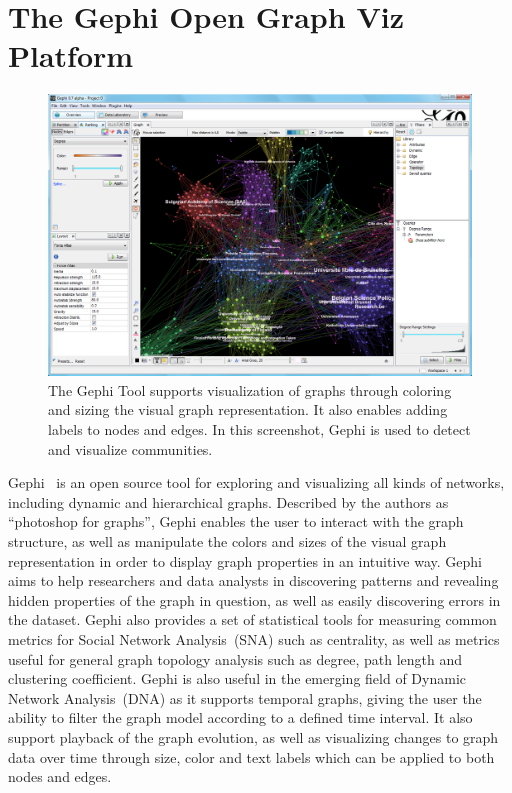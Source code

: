 \section{The Gephi Open Graph Viz Platform}

\begin{figure}[h]
    \centering
    \includegraphics[width=\textwidth]{img/gephi1}
    \caption{The Gephi Tool supports
        visualization of graphs through coloring and sizing the visual
        graph
        representation. It also enables adding labels to nodes and
        edges. In
        this screenshot, Gephi is used to detect and visualize
    communities.}
\label{img:gephi1}
\end{figure}

Gephi~\cite{ICWSM09154} is an open source tool for exploring and
visualizing all kinds of networks, including dynamic and hierarchical
graphs. Described by the authors as ``photoshop for graphs'', Gephi
enables the user to interact with the graph structure, as well as
manipulate the colors and sizes of the visual graph representation in
order to display graph properties in an intuitive way. Gephi aims to
help researchers and data analysts in discovering patterns and revealing
hidden properties of the graph in question, as well as easily
discovering errors in the dataset. Gephi also provides a set of
statistical tools for measuring common metrics for Social Network
Analysis~(SNA) such as centrality, as well as metrics useful for general
graph topology analysis such as degree, path length and clustering
coefficient. Gephi is also useful in the emerging field of Dynamic
Network Analysis~(DNA)  as it supports temporal graphs, giving the user
the ability to filter the graph model according to a defined time
interval. It also support playback of the graph evolution, as well as
visualizing changes to graph data over time through size, color and text
labels which can be applied to both nodes and edges.

